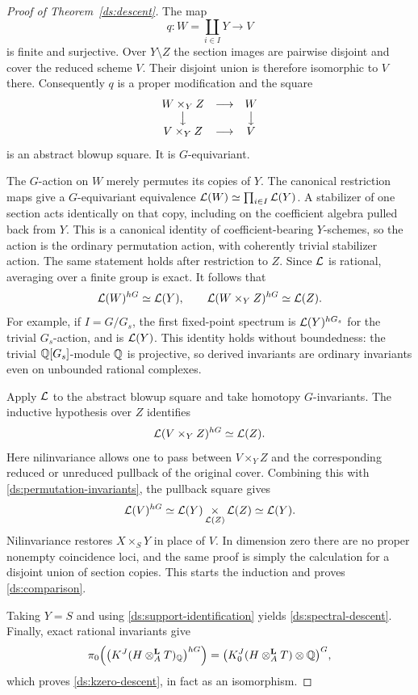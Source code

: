 \begin{proof}[Proof of Theorem~\ref{ds:descent}]
The map
\[
 q:W=\coprod_{i\in I}Y\longrightarrow V
\]
is finite and surjective. Over $Y\setminus Z$ the section images
are pairwise disjoint and cover the reduced scheme $V$. Their
disjoint union is therefore isomorphic to $V$ there. Consequently
$q$ is a proper modification and the square
\[
 \begin{array}{ccc}
 W\times_Y Z&\longrightarrow&W\\
 \big\downarrow&&\big\downarrow\\
 V\times_Y Z&\longrightarrow&V
 \end{array}
\]
is an abstract blowup square. It is $G$-equivariant.

The $G$-action on $W$ merely permutes its copies of $Y$.
The canonical restriction maps give a $G$-equivariant equivalence
$\mathcal{L}(W)\simeq\prod_{i\in I}\mathcal{L}(Y)$.
A stabilizer of one section acts identically on that copy, including
on the coefficient algebra pulled back from $Y$. This is a
canonical identity of coefficient-bearing $Y$-schemes, so the
action is the ordinary permutation action, with coherently trivial
stabilizer action. The same statement holds after restriction to $Z$.
Since $\mathcal{L}$ is rational, averaging over a finite group is exact.
It follows that
\begin{equation}
 \mathcal{L}(W)^{hG}\simeq\mathcal{L}(Y),
 \qquad
 \mathcal{L}(W\times_Y Z)^{hG}\simeq\mathcal{L}(Z).
 \label{ds:permutation-invariants}
\end{equation}
For example, if $I=G/G_s$, the first fixed-point spectrum is
$\mathcal{L}(Y)^{hG_s}$ for the trivial $G_s$-action, and is $\mathcal{L}(Y)$.
This identity holds without boundedness: the trivial
$\mathbb{Q}[G_s]$-module $\mathbb{Q}$ is projective, so derived invariants are
ordinary invariants even on unbounded rational complexes.

Apply $\mathcal{L}$ to the abstract blowup square and take homotopy
$G$-invariants. The inductive hypothesis over $Z$ identifies
\[
 \mathcal{L}(V\times_Y Z)^{hG}\simeq\mathcal{L}(Z).
\]
Here nilinvariance allows one to pass between $V\times_Y Z$ and
the corresponding reduced or unreduced pullback of the original
cover. Combining this with \eqref{ds:permutation-invariants}, the
pullback square gives
\[
 \mathcal{L}(V)^{hG}
 \simeq\mathcal{L}(Y)\mathop{\times}_{\mathcal{L}(Z)}\mathcal{L}(Z)
 \simeq\mathcal{L}(Y).
\]
Nilinvariance restores $X\times_S Y$ in place of $V$. In
dimension zero there are no proper nonempty coincidence loci, and
the same proof is simply the calculation for a disjoint union of
section copies. This starts the induction and proves
\eqref{ds:comparison}.

Taking $Y=S$ and using \eqref{ds:support-identification} yields
\eqref{ds:spectral-descent}. Finally, exact rational invariants give
\[
 \pi_0\Bigl(\bigl(K^J(H\otimes_A^{\mathbf L}T)_{\mathbb{Q}}\bigr)^{hG}\Bigr)
   =\bigl(K_0^J(H\otimes_A^{\mathbf L}T)\otimes\mathbb{Q}\bigr)^G,
\]
which proves \eqref{ds:kzero-descent}, in fact as an isomorphism.
\end{proof}

